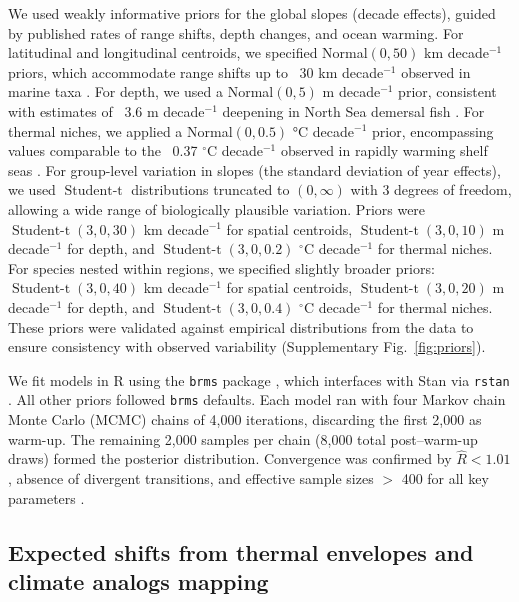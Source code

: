 \documentclass[11pt]{article}
\begin{document}
\begin{spacing}{1.5}
We used weakly informative priors for the global slopes (decade effects), guided by published rates of range shifts, depth changes, and ocean warming. For latitudinal and longitudinal centroids, we specified Normal$(0, 50)$ km decade$^{-1}$ priors, which accommodate range shifts up to ~30 km decade$^{-1}$ observed in marine taxa \citep{poloczanska_global_2013}. For depth, we used a Normal$(0, 5)$ m decade$^{-1}$ prior, consistent with estimates of ~3.6 m decade$^{-1}$ deepening in North Sea demersal fish \citep{dulvy_climate_2008}. For thermal niches, we applied a Normal$(0, 0.5)$ °C decade$^{-1}$ prior, encompassing values comparable to the ~0.37 $^\circ$C decade$^{-1}$ observed in rapidly warming shelf seas \citep{chen_longterm_2020}.
For group-level variation in slopes (the standard deviation of year effects), we used $\operatorname{Student-t}$ distributions truncated to $(0,\infty)$ with 3 degrees of freedom, allowing a wide range of biologically plausible variation. Priors were $\operatorname{Student-t}(3, 0, 30)$ km decade$^{-1}$ for spatial centroids, $\operatorname{Student-t}(3, 0, 10)$ m decade$^{-1}$ for depth, and $\operatorname{Student-t}(3, 0, 0.2)$ $^\circ$C decade$^{-1}$ for thermal niches. For species nested within regions, we specified slightly broader priors: $\operatorname{Student-t}(3, 0, 40)$ km decade$^{-1}$ for spatial centroids, $\operatorname{Student-t}(3, 0, 20)$ m decade$^{-1}$ for depth, and $\operatorname{Student-t}(3, 0, 0.4)$ $^\circ$C decade$^{-1}$ for thermal niches. These priors were validated against empirical distributions from the data to ensure consistency with observed variability (Supplementary Fig.~\ref{fig:priors}).

We fit models in R using the \texttt{brms} package \citep{burkner_brms_2017}, which interfaces with Stan via \texttt{rstan} \citep{stan2024,stan_development_team_rstan_2024}. All other priors followed \texttt{brms} defaults. Each model ran with four Markov chain Monte Carlo (MCMC) chains of 4,000 iterations, discarding the first 2,000 as warm-up. The remaining 2,000 samples per chain (8,000 total post–warm-up draws) formed the posterior distribution. Convergence was confirmed by $\hat{R} < 1.01$, absence of divergent transitions, and effective sample sizes $>$ 400 for all key parameters \citep{vehtari_rank-normalization_2021}.


\subsection{Expected shifts from thermal envelopes and climate analogs mapping}


\end{spacing}
\end{document}
